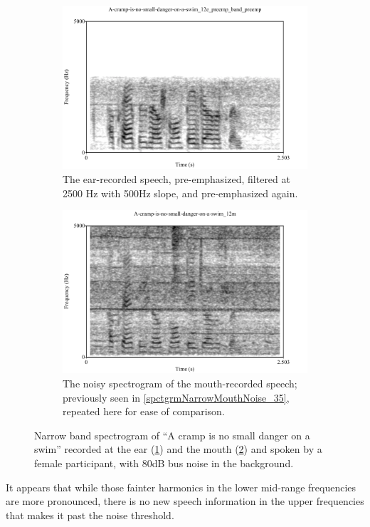 \begin{figure}[b!]
\centering
\begin{subfigure}{0.475\textwidth}
  \centering
  \includegraphics[width=1\linewidth]{figure/spctgrmNarrowEarNoisePrempFiltPremp.pdf}
  \caption{The ear-recorded speech, pre-emphasized, filtered at 2500 Hz with 500Hz slope, and pre-emphasized again.}
  \label{spctgrmNarrowEarNoisePrempFiltPremp_35}
\end{subfigure}%
\hfill
\begin{subfigure}{0.475\textwidth}
  \centering
  \includegraphics[width=1\linewidth]{figure/spctgrmNarrowMthNoise_35.pdf}
  \caption{The noisy spectrogram of the mouth-recorded speech; previously seen in \ref{spctgrmNarrowMouthNoise_35}, repeated here for ease of comparison.}
  \label{spctgrmNarrowMouthNoise_35_compare}
\end{subfigure}
\caption{Narrow band spectrogram of ``A cramp is no small danger on a swim'' recorded at the ear (\ref{spctgrmNarrowEarNoisePrempFiltPremp_35}) and the mouth (\ref{spctgrmNarrowMouthNoise_35_compare}) and spoken by a female participant, with 80dB bus noise in the background.}
\label{fig:ear_pfp}
\end{figure}
It appears that while those fainter harmonics in the lower mid-range frequencies are more pronounced, there is no new speech information in the upper frequencies that makes it past the noise threshold.

